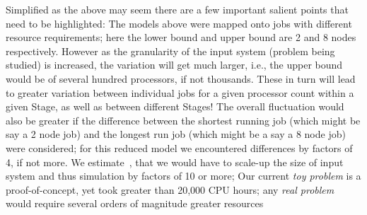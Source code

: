 \documentclass[conference,final]{IEEEtran}
\newcommand{\jha}[0]{}
\begin{document}

Simplified as the above may seem there are a few important salient
points that need to be highlighted: The models above were mapped onto
jobs with different resource requirements; here the lower bound and
upper bound are 2 and 8 nodes respectively. However as the granularity
of the input system (problem being studied) is increased, the
variation will get much larger, i.e., the upper bound would be of
several hundred processors, if not thousands. These in turn will lead
to greater variation between individual jobs for a given processor
count within a given Stage, as well as between different Stages!  The
overall fluctuation would also be greater if the difference between
the shortest running job (which might be say a 2 node job) and the
longest run job (which might be a say a 8 node job) were considered;
for this reduced model we encountered differences by factors of 4, if
not more.  We estimate~\cite{DO2007}, that we would have to scale-up
the size of input system and thus simulation by factors of 10 or more;
Our current {\it toy problem} is a proof-of-concept, yet took greater
than 20,000 CPU hours; any {\it real problem} would require several
orders of magnitude greater resources


\end{document}
